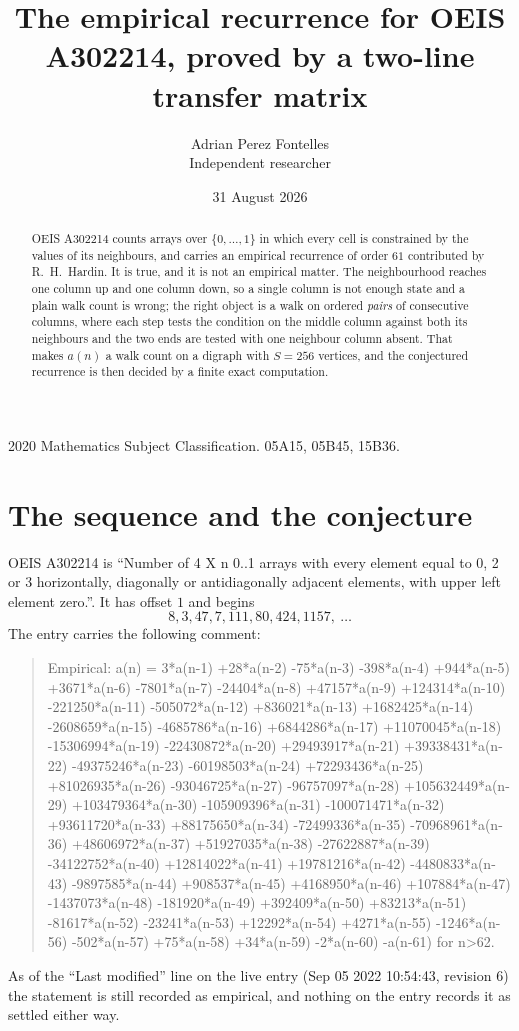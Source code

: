 \documentclass[11pt,a4paper]{article}
\title{The empirical recurrence for OEIS A302214, proved by a two-line transfer matrix}
\author{Adrian Perez Fontelles\\ \small Independent researcher}
\date{31 August 2026}
\theoremstyle{plain}
\theoremstyle{definition}
\begin{document}
\maketitle

\begin{abstract}
OEIS A302214 counts arrays over $\{0,\dots,1\}$ in which every cell is constrained by the
values of its neighbours, and carries an empirical recurrence of order $61$ contributed
by R.~H.~Hardin. It is true, and it is not an empirical matter. The neighbourhood reaches one
column up and one column down, so a single column is not enough state and a plain walk count
is wrong; the right object is a walk on ordered \emph{pairs} of consecutive columns, where
each step tests the condition on the middle column against both its neighbours and the two
ends are tested with one neighbour column absent. That makes $a(n)$ a walk count on a digraph
with $S=256$ vertices, and the conjectured recurrence is then decided by a finite exact
computation.
\end{abstract}

\noindent\small 2020 Mathematics Subject Classification. 05A15, 05B45, 15B36.\normalsize

\section{The sequence and the conjecture}

OEIS A302214 is ``Number of 4 X n 0..1 arrays with every element equal to 0, 2 or 3 horizontally, diagonally or antidiagonally adjacent elements, with upper left element zero.''. It has offset $1$ and begins
\[
8, 3, 47, 7, 111, 80, 424, 1157,\ \dots
\]
The entry carries the following comment:
\begin{quote}\small
Empirical: a(n) = 3*a(n-1) +28*a(n-2) -75*a(n-3) -398*a(n-4) +944*a(n-5) +3671*a(n-6) -7801*a(n-7) -24404*a(n-8) +47157*a(n-9) +124314*a(n-10) -221250*a(n-11) -505072*a(n-12) +836021*a(n-13) +1682425*a(n-14) -2608659*a(n-15) -4685786*a(n-16) +6844286*a(n-17) +11070045*a(n-18) -15306994*a(n-19) -22430872*a(n-20) +29493917*a(n-21) +39338431*a(n-22) -49375246*a(n-23) -60198503*a(n-24) +72293436*a(n-25) +81026935*a(n-26) -93046725*a(n-27) -96757097*a(n-28) +105632449*a(n-29) +103479364*a(n-30) -105909396*a(n-31) -100071471*a(n-32) +93611720*a(n-33) +88175650*a(n-34) -72499336*a(n-35) -70968961*a(n-36) +48606972*a(n-37) +51927035*a(n-38) -27622887*a(n-39) -34122752*a(n-40) +12814022*a(n-41) +19781216*a(n-42) -4480833*a(n-43) -9897585*a(n-44) +908537*a(n-45) +4168950*a(n-46) +107884*a(n-47) -1437073*a(n-48) -181920*a(n-49) +392409*a(n-50) +83213*a(n-51) -81617*a(n-52) -23241*a(n-53) +12292*a(n-54) +4271*a(n-55) -1246*a(n-56) -502*a(n-57) +75*a(n-58) +34*a(n-59) -2*a(n-60) -a(n-61) for n>62.
\end{quote}
As of the ``Last modified'' line on the live entry (Sep 05 2022 10:54:43, revision 6) the statement is
still recorded as empirical, and nothing on the entry records it as settled either way.
\end{document}
